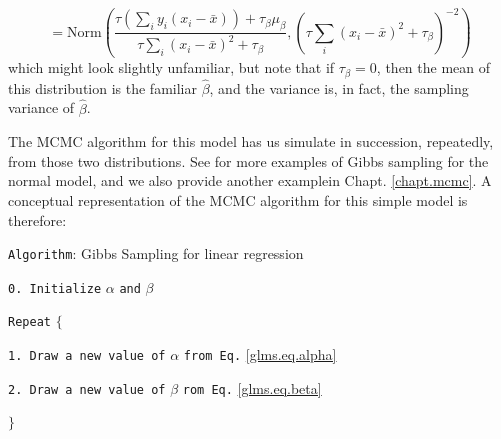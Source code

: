 \begin{equation}
 [\beta|y,\alpha]  = \mbox{Norm}\left(
\frac{ \tau (\sum_{i} y_{i}(x_{i}-\bar{x}) ) + \tau_{\beta} \mu_{\beta}}
{ \tau \sum_{i} (x_{i}-\bar{x})^{2} + \tau_{\beta}},
(\tau \sum_{i} (x_{i}-\bar{x})^{2} + \tau_{\beta} )^{-2} \right)
\label{glms.eq.beta}
\end{equation}
which might look slightly unfamiliar, but note that if $\tau_{\beta} = 0$, 
then the mean of this distribution is the familiar $\hat{\beta}$, and
the variance is, in fact, the sampling variance of $\hat{\beta}$. 

The MCMC algorithm for this model has us simulate in succession,
repeatedly, from those two distributions. See \citet{gelman_etal:2004}
for more examples of Gibbs sampling for the normal model, and we also
provide another examplein Chapt. \ref{chapt.mcmc}. A
conceptual representation of the MCMC algorithm for this simple model
is therefore:

\vspace{.1in}

\parbox[h]{6in}{
{\tt Algorithm}: Gibbs Sampling for linear regression

\vspace{.1in}

\hspace{.25in}
     {\tt  0. Initialize} $\alpha$ {\tt and} $\beta$

\vspace{.1in}


\hspace{.25in}
     {\tt  Repeat} $\{$

\vspace{.1in}
   
\hspace{.45in}
        {\tt 1. Draw a new value of} $\alpha$ {\tt from Eq.} \ref{glms.eq.alpha}

\vspace{.1in}

\hspace{.45in}
        {\tt 2. Draw a new value of} $\beta$  {\tt rom Eq.} \ref{glms.eq.beta}

\vspace{.1in}

\hspace{.25in}
     $\}$
}

